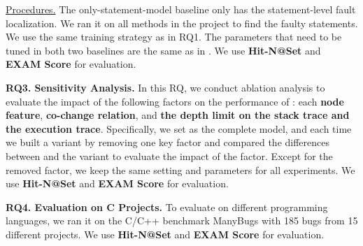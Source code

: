 
\underline{Procedures.}
The only-statement-model baseline only has the statement-level fault
localization. We ran it on all methods in the project to find the
faulty statements. We use the same training strategy as in RQ1.  The
parameters that need to be tuned in both two baselines are the same as
in {\tool}. We use \textbf{Hit-N@Set} and \textbf{EXAM Score} for
evaluation.

{\bf RQ3. Sensitivity Analysis.}  In this RQ, we conduct ablation
analysis to evaluate the impact of the following factors on the
performance of {\tool}: each {\bf node feature}, {\bf co-change
relation}, and {\bf the depth limit on the stack trace and the
execution trace}. Specifically, we set \tool as the complete model,
and each time we built a variant by removing one key factor and
compared the differences between {\tool} and the variant to evaluate
the impact of the factor. Except for the removed factor, we keep the
same setting and parameters for all experiments. We
use \textbf{Hit-N@Set} and \textbf{EXAM Score} for evaluation.

{\bf RQ4. Evaluation on C Projects.}
%
To evaluate {\tool} on different programming languages, we ran it on
the C/C++ benchmark ManyBugs \cite{manybugs} with 185 bugs from 15
different projects. We use \textbf{Hit-N@Set} and \textbf{EXAM Score}
for evaluation.
